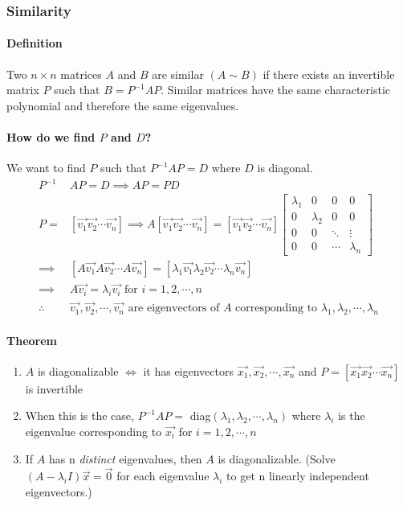 \subsubsection*{Similarity}
\paragraph*{Definition}
Two $n \times n$ matrices $A$ and $B$ are similar $(A \sim B)$ if there exists an invertible matrix $P$ such that $B = P^{-1}AP$. 
Similar matrices have the same characteristic polynomial and therefore the same eigenvalues.

\paragraph*{How do we find $P$ and $D$?}
We want to find $P$ such that $P^{-1}AP = D$ where $D$ is diagonal.
\begin{align*}
    P^{-1}&AP = D \implies AP = PD\\
    P = &[\vec{v_1} \vec{v_2} \cdots \vec{v_n}] \implies A[\vec{v_1} \vec{v_2} \cdots \vec{v_n}] = [\vec{v_1} \vec{v_2} \cdots \vec{v_n}]\begin{bmatrix}
        \lambda_1 & 0 & 0 & 0\\
        0 & \lambda_2 & 0 & 0 \\
        0 & 0 & \ddots & \vdots \\
        0 & 0 & \cdots & \lambda_n
    \end{bmatrix} \\
    \implies &[A\vec{v_1} A\vec{v_2} \cdots A\vec{v_n}] = [\lambda_1 \vec{v_1} \lambda_2 \vec{v_2} \cdots \lambda_n \vec{v_n}]\\
    \implies &A\vec{v_i} = \lambda_i \vec{v_i} \text{ for } i = 1, 2, \cdots, n\\
    \therefore \quad &\vec{v_1}, \vec{v_2}, \cdots, \vec{v_n} \text{ are eigenvectors of } A \text{ corresponding to } \lambda_1, \lambda_2, \cdots, \lambda_n
\end{align*}

\paragraph*{Theorem}
\begin{enumerate}
    \item $A$ is diagonalizable $\iff$ it has eigenvectors $\vec{x_1}, \vec{x_2}, \cdots, \vec{x_n}$ and $P = [\vec{x_1} \vec{x_2} \cdots \vec{x_n}]$ is invertible
    \item When this is the case, $P^{-1}AP = $ diag$(\lambda_1, \lambda_2, \cdots, \lambda_n)$ where $\lambda_i$ is the eigenvalue corresponding to $\vec{x_i}$ for $i = 1, 2, \cdots, n$
    \item If $A$ has n \emph{distinct} eigenvalues, then $A$ is diagonalizable. (Solve $(A - \lambda_i I)\vec{x} = \vec{0}$ for each eigenvalue $\lambda_i$ to get n linearly independent eigenvectors.)
\end{enumerate}

